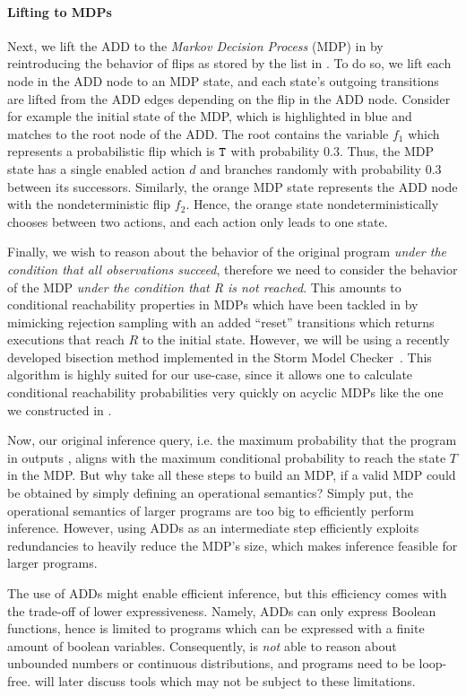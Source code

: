 \paragraph{Lifting to MDPs}
Next, we lift the ADD to the \textit{Markov Decision Process} (MDP) in  by reintroducing the behavior of flips as stored by the list in .
To do so, we lift each node in the ADD node to an MDP state, and each state's outgoing transitions are lifted from the ADD edges depending on the flip in the ADD node.
Consider for example the initial state of the MDP, which is highlighted in blue and matches to the root node of the ADD.
The root contains the variable $f_1$ which represents a probabilistic flip which is $\texttt{T}$ with probability $0.3$.
Thus, the MDP state has a single enabled action $d$ and branches randomly with probability $0.3$ between its successors. 
Similarly, the orange MDP state represents the ADD node with the nondeterministic flip $f_2$.
Hence, the orange state nondeterministically chooses between two actions, and each action only leads to one state.


Finally, we wish to reason about the behavior of the original program \textit{under the condition that all observations succeed}, therefore we need to consider the behavior of the MDP \textit{under the condition that R is not reached}.
This amounts to conditional reachability properties in MDPs which have been tackled in \citet{baier2014computing, junges2021runtime} by mimicking rejection sampling with an added \enquote{reset} transitions which returns executions that reach $R$ to the initial state.
However, we will be using a recently developed bisection method implemented in the Storm Model Checker~\citeBisection.
This algorithm is highly suited for our use-case, since it allows one to calculate conditional reachability probabilities very quickly on acyclic MDPs like the one we constructed in .

\medskip

Now, our original inference query, i.e. the maximum probability that the program in  outputs \TRUE, aligns with the maximum conditional probability to reach the state $T$ in the MDP.
But why take all these steps to build an MDP, if a valid MDP could be obtained by simply defining an operational semantics?
Simply put, the operational semantics of larger programs are too big to efficiently perform inference.
However, using ADDs as an intermediate step efficiently exploits redundancies to heavily reduce the MDP's size, which makes inference feasible for larger programs.

The use of ADDs might enable efficient inference, but this efficiency comes with the trade-off of lower expressiveness.
Namely, ADDs can only express Boolean functions, hence \NDICE is limited to programs which can be expressed with a finite amount of boolean variables.
Consequently, \NDICE is \textit{not} able to reason about unbounded numbers or continuous distributions, and programs need to be loop-free.
 will later discuss tools which may not be subject to these limitations.

